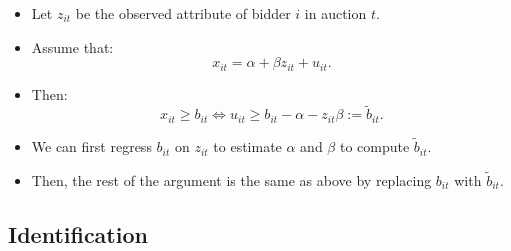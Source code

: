 \documentclass[
]{book}
\providecommand{\tightlist}{%
  \setlength{\itemsep}{0pt}\setlength{\parskip}{0pt}}
\begin{document}
\begin{itemize}
\tightlist
\item
  Let \(z_{it}\) be the observed attribute of bidder \(i\) in auction \(t\).
\item
  Assume that:
  \[
  x_{it} = \alpha + \beta z_{it} + u_{it}.
  \]
\item
  Then:
  \[
  x_{it} \ge b_{it} \Leftrightarrow u_{it} \ge b_{it} - \alpha - z_{it} \beta := \tilde{b}_{it}.
  \]
\item
  We can first regress \(b_{it}\) on \(z_{it}\) to estimate \(\alpha\) and \(\beta\) to compute \(\tilde{b}_{it}\).
\item
  Then, the rest of the argument is the same as above by replacing \(b_{it}\) with \(\tilde{b}_{it}\).
\end{itemize}

\hypertarget{identification-2}{%
\subsection{Identification}\label{identification-2}}
\end{document}
